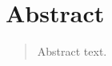 \chapter*{\centering \LARGE Abstract}
\begin{quotation}
\noindent

Abstract text.

\end{quotation}
\clearpage
